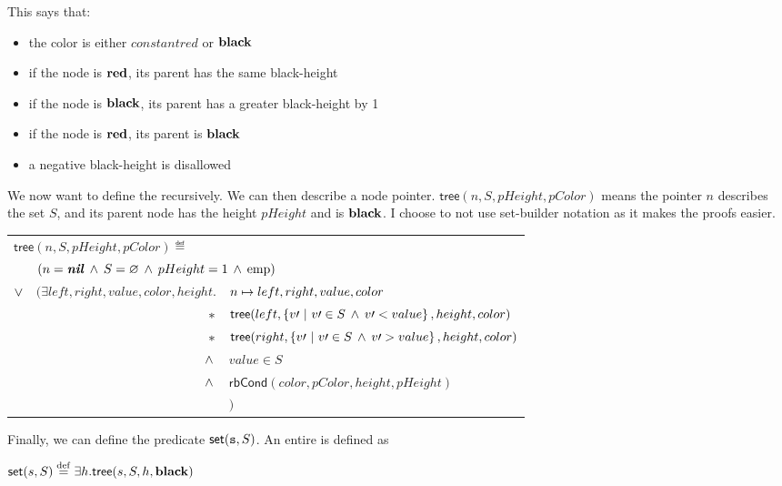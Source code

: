 This says that:

\begin{itemize}
\item the color is either $constant{red}$ or $\mathbf{black}$
\item if the node is $\mathbf{red}$, its parent has the same black-height
\item if the node is $\mathbf{black}$, its parent has a greater black-height by 1
\item if the node is $\mathbf{red}$, its parent is $\mathbf{black}$
\item a negative black-height is disallowed
\end{itemize}

We now want to define the \RBt recursively.
We can then describe a node pointer.
$\mathsf{tree}(n, S, pHeight, pColor)$ means
  the pointer $n$ describes the set $S$,
  and its parent node has the height $pHeight$ and is $\mathbf{black}$.
I choose to not use set-builder notation
  as it makes the proofs easier.

\VEm
\begin{tabular}{ r r l }
\multicolumn{3}{l}{ $\mathsf{tree}(n, S, pHeight, pColor) \eqdef$ } \\
       & \multicolumn{2}{l}{ $(n = \textbf{\textit{nil}} \hspace{0.2em}\land\hspace{0.2em} S = \varnothing \hspace{0.2em}\land\hspace{0.2em} pHeight = 1 \hspace{0.2em}\land\hspace{0.2em} \mathord\mathrm{emp})$ } \\
$\lor$ & $(\exists left, right, value, color, height.$ & $n \mapsto left, right, value, color$ \\
       &                                       $\mathbin{\ast}$ & $\mathsf{tree}(left, \left\{v\prime \ \middle| \ v\prime \in S \hspace{0.2em}\land\hspace{0.2em} v\prime < value \right\}, height, color)$ \\
       &                                       $\mathbin{\ast}$ & $\mathsf{tree}(right, \left\{v\prime \ \middle| \ v\prime \in S \hspace{0.2em}\land\hspace{0.2em} v\prime > value \right\}, height, color)$ \\
       &                                       $\hspace{0.2em}\land\hspace{0.2em}$ & $value \in S$ \\
       &                                       $\hspace{0.2em}\land\hspace{0.2em}$ & $\mathsf{rbCond}(color, pColor, height, pHeight)$ \\
       &                                               & $)$
\end{tabular}
\VEm

Finally, we can define the predicate $\mathsf{set}(\texttt{s}, S)$.
An entire \RBt is defined as

\VEm
$\mathsf{set}(s, S) \stackrel{\mathrm{def}}{=} \exists h. \mathsf{tree}(s, S, h, \mathbf{black})$
\VEm

